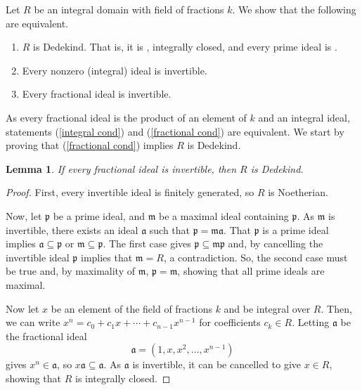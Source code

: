 \documentclass[12pt]{article}
\newtheorem*{lemma*}{Lemma}
\begin{document}
Let $R$ be an integral domain with field of fractions $k$. We show that the following are equivalent.
\begin{enumerate}
\item $R$ is Dedekind. That is, it is , integrally closed, and every prime ideal is .
\item Every nonzero (integral) ideal is invertible.\label{integral cond}
\item Every fractional ideal is invertible.\label{fractional cond}
\end{enumerate}
As every fractional ideal is the product of an element of $k$ and an integral ideal, statements (\ref{integral cond}) and (\ref{fractional cond}) are equivalent.
We start by proving that (\ref{fractional cond}) implies $R$ is Dedekind.

\begin{lemma*}
If every fractional ideal is invertible, then $R$ is Dedekind.
\end{lemma*}
\begin{proof}
First, every invertible ideal is finitely generated, so $R$ is Noetherian.

Now, let $\mathfrak{p}$ be a prime ideal, and $\mathfrak{m}$ be a maximal ideal containing $\mathfrak{p}$. As $\mathfrak{m}$ is invertible, there exists an ideal $\mathfrak{a}$ such that $\mathfrak{p}=\mathfrak{m}\mathfrak{a}$.
That $\mathfrak{p}$ is a prime ideal implies $\mathfrak{a}\subseteq\mathfrak{p}$ or $\mathfrak{m}\subseteq\mathfrak{p}$. The first case gives $\mathfrak{p}\subseteq\mathfrak{m}\mathfrak{p}$ and, by cancelling the invertible ideal $\mathfrak{p}$ implies that $\mathfrak{m}=R$, a contradiction. So, the second case must be true and, by maximality of $\mathfrak{m}$, $\mathfrak{p}=\mathfrak{m}$, showing that all prime ideals are maximal.

Now let $x$ be an element of the field of fractions $k$ and be integral over $R$.
Then, we can write $x^n=c_0+c_1x+\cdots+c_{n-1}x^{n-1}$ for coefficients $c_k\in R$.
Letting $\mathfrak{a}$ be the fractional ideal
\begin{equation*}
\mathfrak{a} = (1,x,x^2,\ldots,x^{n-1})
\end{equation*}
gives $x^n\in\mathfrak{a}$, so $x\mathfrak{a}\subseteq\mathfrak{a}$. As $\mathfrak{a}$ is invertible, it can be cancelled to give $x\in R$, showing that $R$ is integrally closed.
\end{proof}
\end{document}
